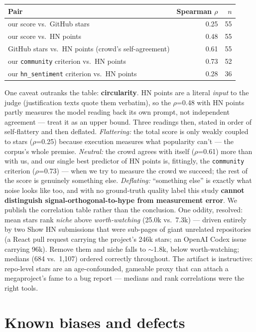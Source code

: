 \documentclass[10pt]{article}
\begin{document}
\begin{center}
\small
\begin{tabular}{lrr}
\toprule
\bf Pair & \bf Spearman $\rho$ & $n$ \\
\midrule
our score vs.\ GitHub stars & 0.25 & 55 \\
our score vs.\ HN points & 0.48 & 55 \\
GitHub stars vs.\ HN points (crowd's self-agreement) & 0.61 & 55 \\
our \texttt{community} criterion vs.\ HN points & 0.73 & 52 \\
our \texttt{hn\_sentiment} criterion vs.\ HN points & 0.28 & 36 \\
\bottomrule
\end{tabular}
\end{center}

One caveat outranks the table: \textbf{circularity}. HN points are a literal \emph{input} to the judge (justification texts quote them verbatim), so the $\rho$=0.48 with HN points partly measures the model reading back its own prompt, not independent agreement --- treat it as an upper bound. Three readings then, stated in order of self-flattery and then deflated. \emph{Flattering:} the total score is only weakly coupled to stars ($\rho$=0.25) because execution measures what popularity can't --- the corpus's whole premise. \emph{Neutral:} the crowd agrees with itself ($\rho$=0.61) more than with us, and our single best predictor of HN points is, fittingly, the \texttt{community} criterion ($\rho$=0.73) --- when we try to measure the crowd we succeed; the rest of the score is genuinely something else. \emph{Deflating:} ``something else'' is exactly what noise looks like too, and with no ground-truth quality label this study \textbf{cannot distinguish signal-orthogonal-to-hype from measurement error}. We publish the correlation table rather than the conclusion. One oddity, resolved: mean stars rank \emph{niche} above \emph{worth-watching} (25.0k vs.\ 7.3k) --- driven entirely by two Show HN submissions that were sub-pages of giant unrelated repositories (a React pull request carrying the project's 246k stars; an OpenAI Codex issue carrying 96k). Remove them and niche falls to $\sim$1.8k, below worth-watching; medians (684 vs.\ 1{,}107) ordered correctly throughout. The artifact is instructive: repo-level stars are an age-confounded, gameable proxy that can attach a megaproject's fame to a bug report --- medians and rank correlations were the right tools.

\section{Known biases and defects}
\label{sec:defects}
\end{document}
